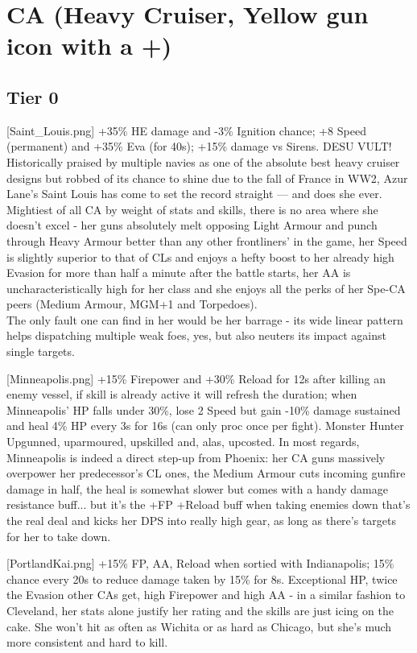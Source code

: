  
 
\newpage
\section[CA]{CA (Heavy Cruiser, Yellow gun icon with a +)}
 
\subsection{Tier 0}
[Saint_Louis.png]
{+35\% HE damage and -3\% Ignition chance; +8 Speed (permanent) and +35\% Eva (for 40s); +15\% damage vs Sirens.}
{DESU VULT!}
{Historically praised by multiple navies as one of the absolute best heavy cruiser designs but robbed of its chance to shine due to the fall of France in WW2, Azur Lane's Saint Louis has come to set the record straight --- and does she ever.\\
Mightiest of all CA by weight of stats and skills, there is no area where she doesn't excel - her guns absolutely melt opposing Light Armour and punch through Heavy Armour better than any other frontliners' in the game, her Speed is slightly superior to that of CLs and enjoys a hefty boost to her already high Evasion for more than half a minute after the battle starts, her AA is uncharacteristically high for her class and she enjoys all the perks of her Spe-CA peers (Medium Armour, MGM+1 and Torpedoes).\\
The only fault one can find in her would be her barrage - its wide linear pattern helps dispatching multiple weak foes, yes, but also neuters its impact against single targets.}

[Minneapolis.png]
{+15\% Firepower and +30\% Reload for 12s after killing an enemy vessel, if skill is already active it will refresh the duration; when Minneapolis' HP falls under 30\%, lose 2 Speed but gain -10\% damage sustained and heal 4\% HP every 3s for 16s (can only proc once per fight).}
{Monster Hunter}
{Upgunned, uparmoured, upskilled and, alas, upcosted. In most regards, Minneapolis is indeed a direct step-up from Phoenix: her CA guns massively overpower her predecessor's CL ones, the Medium Armour cuts incoming gunfire damage in half, the heal is somewhat slower but comes with a handy damage resistance buff... but it's the +FP +Reload buff when taking enemies down that's the real deal and kicks her DPS into really high gear, as long as there's targets for her to take down.}

[PortlandKai.png]
{+15\% FP, AA, Reload when sortied with Indianapolis; 15\% chance every 20s to reduce damage taken by 15\% for 8s.}
{}
{Exceptional HP, twice the Evasion other CAs get, high Firepower and high AA - in a similar fashion to Cleveland, her stats alone justify her rating and the skills are just icing on the cake. She won't hit as often as Wichita or as hard as Chicago, but she's much more consistent and hard to kill.}
 
